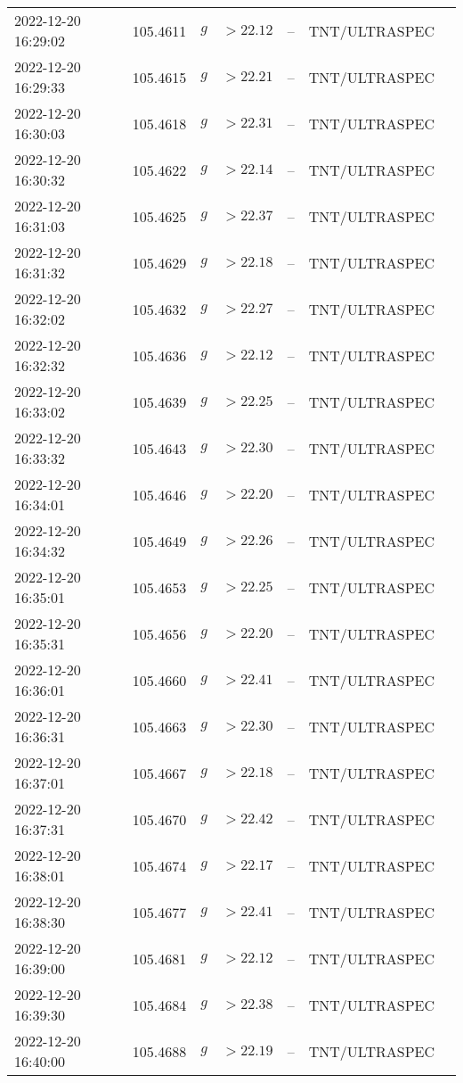 \documentclass{nature_plusfigure}
\begin{document}
\begin{supplement}
\begin{center}
\begin{longtable}{lllllll}
2022-12-20 16:29:02 & 105.4611 & $g$ & $>22.12$ & -- & TNT/ULTRASPEC &  \\ 
2022-12-20 16:29:33 & 105.4615 & $g$ & $>22.21$ & -- & TNT/ULTRASPEC &  \\ 
2022-12-20 16:30:03 & 105.4618 & $g$ & $>22.31$ & -- & TNT/ULTRASPEC &  \\ 
2022-12-20 16:30:32 & 105.4622 & $g$ & $>22.14$ & -- & TNT/ULTRASPEC &  \\ 
2022-12-20 16:31:03 & 105.4625 & $g$ & $>22.37$ & -- & TNT/ULTRASPEC &  \\ 
2022-12-20 16:31:32 & 105.4629 & $g$ & $>22.18$ & -- & TNT/ULTRASPEC &  \\ 
2022-12-20 16:32:02 & 105.4632 & $g$ & $>22.27$ & -- & TNT/ULTRASPEC &  \\ 
2022-12-20 16:32:32 & 105.4636 & $g$ & $>22.12$ & -- & TNT/ULTRASPEC &  \\ 
2022-12-20 16:33:02 & 105.4639 & $g$ & $>22.25$ & -- & TNT/ULTRASPEC &  \\ 
2022-12-20 16:33:32 & 105.4643 & $g$ & $>22.30$ & -- & TNT/ULTRASPEC &  \\ 
2022-12-20 16:34:01 & 105.4646 & $g$ & $>22.20$ & -- & TNT/ULTRASPEC &  \\ 
2022-12-20 16:34:32 & 105.4649 & $g$ & $>22.26$ & -- & TNT/ULTRASPEC &  \\ 
2022-12-20 16:35:01 & 105.4653 & $g$ & $>22.25$ & -- & TNT/ULTRASPEC &  \\ 
2022-12-20 16:35:31 & 105.4656 & $g$ & $>22.20$ & -- & TNT/ULTRASPEC &  \\ 
2022-12-20 16:36:01 & 105.4660 & $g$ & $>22.41$ & -- & TNT/ULTRASPEC &  \\ 
2022-12-20 16:36:31 & 105.4663 & $g$ & $>22.30$ & -- & TNT/ULTRASPEC &  \\ 
2022-12-20 16:37:01 & 105.4667 & $g$ & $>22.18$ & -- & TNT/ULTRASPEC &  \\ 
2022-12-20 16:37:31 & 105.4670 & $g$ & $>22.42$ & -- & TNT/ULTRASPEC &  \\ 
2022-12-20 16:38:01 & 105.4674 & $g$ & $>22.17$ & -- & TNT/ULTRASPEC &  \\ 
2022-12-20 16:38:30 & 105.4677 & $g$ & $>22.41$ & -- & TNT/ULTRASPEC &  \\ 
2022-12-20 16:39:00 & 105.4681 & $g$ & $>22.12$ & -- & TNT/ULTRASPEC &  \\ 
2022-12-20 16:39:30 & 105.4684 & $g$ & $>22.38$ & -- & TNT/ULTRASPEC &  \\ 
2022-12-20 16:40:00 & 105.4688 & $g$ & $>22.19$ & -- & TNT/ULTRASPEC &  \\ 

\end{longtable}
\end{center}
\end{supplement}
\end{document}
